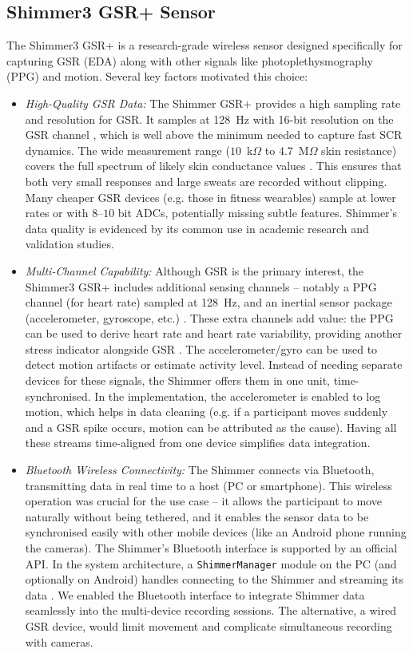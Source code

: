 \documentclass{report}
\begin{document}
    \subsection*{Shimmer3 GSR+ Sensor}
    The Shimmer3 GSR+ is a research-grade wireless sensor designed specifically for capturing GSR (EDA) along with other signals like photoplethysmography (PPG) and motion. Several key factors motivated this choice:
    \begin{itemize}
        \item \textit{High-Quality GSR Data:} The Shimmer GSR+ provides a high sampling rate and resolution for GSR. It samples at 128~Hz with 16-bit resolution on the GSR channel \cite{shimmerdoc8}, which is well above the minimum needed to capture fast SCR dynamics. The wide measurement range ($10$~k$\Omega$ to $4.7$~M$\Omega$ skin resistance) covers the full spectrum of likely skin conductance values \cite{shimmerdoc8}. This ensures that both very small responses and large sweats are recorded without clipping. Many cheaper GSR devices (e.g. those in fitness wearables) sample at lower rates or with $8$--$10$ bit ADCs, potentially missing subtle features. Shimmer's data quality is evidenced by its common use in academic research and validation studies.

        \item \textit{Multi-Channel Capability:} Although GSR is the primary interest, the Shimmer3 GSR+ includes additional sensing channels -- notably a PPG channel (for heart rate) sampled at 128~Hz, and an inertial sensor package (accelerometer, gyroscope, etc.) \cite{shimmerapi15}. These extra channels add value: the PPG can be used to derive heart rate and heart rate variability, providing another stress indicator alongside GSR \cite{shimmerapi15}. The accelerometer/gyro can be used to detect motion artifacts or estimate activity level. Instead of needing separate devices for these signals, the Shimmer offers them in one unit, time-synchronised. In the implementation, the accelerometer is enabled to log motion, which helps in data cleaning (e.g. if a participant moves suddenly and a GSR spike occurs, motion can be attributed as the cause). Having all these streams time-aligned from one device simplifies data integration.

        \item \textit{Bluetooth Wireless Connectivity:} The Shimmer connects via Bluetooth, transmitting data in real time to a host (PC or smartphone). This wireless operation was crucial for the use case -- it allows the participant to move naturally without being tethered, and it enables the sensor data to be synchronised easily with other mobile devices (like an Android phone running the cameras). The Shimmer's Bluetooth interface is supported by an official API. In the system architecture, a \texttt{ShimmerManager} module on the PC (and optionally on Android) handles connecting to the Shimmer and streaming its data \cite{shimmerapi15}. We enabled the Bluetooth interface to integrate Shimmer data seamlessly into the multi-device recording sessions. The alternative, a wired GSR device, would limit movement and complicate simultaneous recording with cameras.


\end{itemize}
\end{document}
